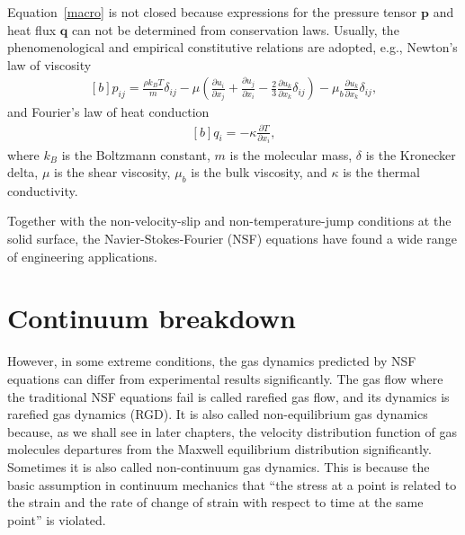 Equation~\eqref{macro} is not closed because expressions for the pressure tensor $\bm{p}$ and heat flux $\bm{q}$ can not be determined from conservation laws. Usually, the phenomenological and empirical constitutive relations  are adopted, e.g., Newton's law of viscosity 
\begin{equation}\label{shear_Chapter1_stress}
\begin{aligned}[b]
p_{ij}=\frac{\rho{}k_BT}{m}\delta_{ij}-
\mu\left(\frac{\partial u_i}{\partial x_j}+\frac{\partial u_j}{\partial x_i}
-\frac{2}{3}\frac{\partial u_k}{\partial x_k}\delta_{ij}\right)
-\mu_b\frac{\partial u_k}{\partial x_k}\delta_{ij},
\end{aligned}
\end{equation}
and Fourier's law of heat conduction 
\begin{equation}\label{heat_Chapter1_conduction}
\begin{aligned}[b]
q_i=-\kappa\frac{\partial T}{\partial x_i},
\end{aligned}
\end{equation}
where $k_B$ is the Boltzmann constant, $m$ is the molecular mass, $\delta$ is the Kronecker delta, $\mu$ is the shear viscosity, $\mu_b$ is the bulk viscosity, and $\kappa$ is the thermal conductivity. 


Together with the non-velocity-slip and non-temperature-jump conditions at the solid surface, the Navier-Stokes-Fourier (NSF) equations have found a wide range of engineering applications. 


\section{Continuum breakdown}\label{continuum_breakdown}

However, in some extreme conditions, the gas dynamics predicted by NSF equations can differ from experimental results significantly. The gas flow where the traditional NSF equations fail is called rarefied gas flow, and its dynamics is rarefied gas dynamics (RGD). It is also called non-equilibrium gas dynamics because, as we shall see in later chapters, the velocity distribution function of gas molecules departures from the Maxwell equilibrium distribution significantly. Sometimes it is also called non-continuum gas dynamics. This is because the basic assumption in continuum mechanics that ``the stress at a point is related to the strain and the rate of change of strain with respect to time at the same point'' is violated.  

